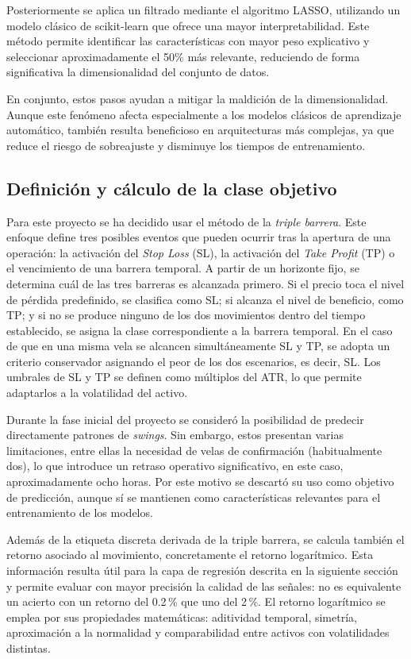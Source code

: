Posteriormente se aplica un filtrado mediante el algoritmo LASSO, utilizando un modelo clásico de scikit-learn que ofrece una mayor interpretabilidad.
Este método permite identificar las características con mayor peso explicativo y seleccionar aproximadamente el 50\% más relevante, reduciendo de
forma significativa la dimensionalidad del conjunto de datos.

En conjunto, estos pasos ayudan a mitigar la maldición de la dimensionalidad. Aunque este fenómeno afecta especialmente a los modelos clásicos de
aprendizaje automático, también resulta beneficioso en arquitecturas más complejas, ya que reduce el riesgo de sobreajuste y disminuye los tiempos de
entrenamiento.

\subsection{Definición y cálculo de la clase objetivo}

Para este proyecto se ha decidido usar el método de la \textit{triple barrera}. Este enfoque define tres posibles eventos que pueden ocurrir tras la
apertura de una operación: la activación del \textit{Stop Loss} (SL), la activación del \textit{Take Profit} (TP) o el vencimiento de una barrera
temporal. A partir de un horizonte fijo, se determina cuál de las tres barreras es alcanzada primero. Si el precio toca el nivel de pérdida
predefinido, se clasifica como SL; si alcanza el nivel de beneficio, como TP; y si no se produce ninguno de los dos movimientos dentro del tiempo
establecido, se asigna la clase correspondiente a la barrera temporal. En el caso de que en una misma vela se alcancen simultáneamente SL y TP, se
adopta un criterio conservador asignando el peor de los dos escenarios, es decir, SL. Los umbrales de SL y TP se definen como múltiplos del ATR, lo
que permite adaptarlos a la volatilidad del activo.

Durante la fase inicial del proyecto se consideró la posibilidad de predecir directamente patrones de \textit{swings}. Sin embargo, estos presentan
varias limitaciones, entre ellas la necesidad de velas de confirmación (habitualmente dos), lo que introduce un retraso operativo significativo, en
este caso, aproximadamente ocho horas. Por este motivo se descartó su uso como objetivo de predicción, aunque sí se mantienen como características
relevantes para el entrenamiento de los modelos.

Además de la etiqueta discreta derivada de la triple barrera, se calcula también el retorno asociado al movimiento, concretamente el retorno
logarítmico. Esta información resulta útil para la capa de regresión descrita en la siguiente sección y permite evaluar con mayor precisión la calidad
de las señales: no es equivalente un acierto con un retorno del 0.2\,\% que uno del 2\,\%. El retorno logarítmico se emplea por sus propiedades
matemáticas: aditividad temporal, simetría, aproximación a la normalidad y comparabilidad entre activos con volatilidades distintas.

